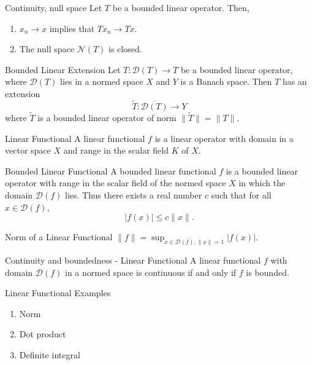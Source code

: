 \documentclass[avery5388,grid,frame]{flashcards}
\begin{document}
\begin{flashcard}[Theorem]{Continuity, null space}
Let $T$ be a bounded linear operator. Then,
\begin{enumerate}
\item $x_n\rightarrow x$ implies that $Tx_n\rightarrow Tx$.
\item The null space $\mathscr{N}(T)$ is closed.
\end{enumerate}
\end{flashcard}

\begin{flashcard}[Theorem]{Bounded Linear Extension}
Let $T\colon \mathscr{D}(T)\rightarrow T$ be a bounded linear operator, where $\mathscr{D}(T)$ lies in a normed space $X$ and $Y$ is a Banach space. Then $T$ has an extension
\[\widetilde{T}\colon\overline{\mathscr{D}(T)}\rightarrow Y\]
where $\widetilde{T}$ is a bounded linear operator of norm $\|\widetilde{T}\|=\|T\|$.
\end{flashcard}

\begin{flashcard}[Definition]{Linear Functional}
A linear functional $f$ is a linear operator with domain in a vector space $X$ and range in the scalar field $K$ of $X$.
\end{flashcard}

\begin{flashcard}[Definition]{Bounded Linear Functional}
A bounded linear functional $f$ is a bounded linear operator with range in the scalar field of the normed space $X$ in which the domain $\mathscr{D}(f)$ lies. Thus there exists a real number $c$ such that for all $x\in\mathscr{D}(f)$,
\[|f(x)|\leq c\|x\|.\]
\end{flashcard}

\begin{flashcard}[Definition]{Norm of a Linear Functional}
$\|f\|=\sup_{x\in\mathscr{D}(f),\|x\|=1}|f(x)|$.
\end{flashcard}

\begin{flashcard}[Theorem]{Continuity and boundedness - Linear Functional} A linear functional $f$ with domain $\mathscr{D}(f)$ in a normed space is continuous if and only if $f$ is bounded.
\end{flashcard}

\begin{flashcard}[Example]{Linear Functional Examples}
\begin{enumerate}
\item Norm
\item Dot product
\item Definite integral
\end{enumerate}
\end{flashcard}
\end{document}
